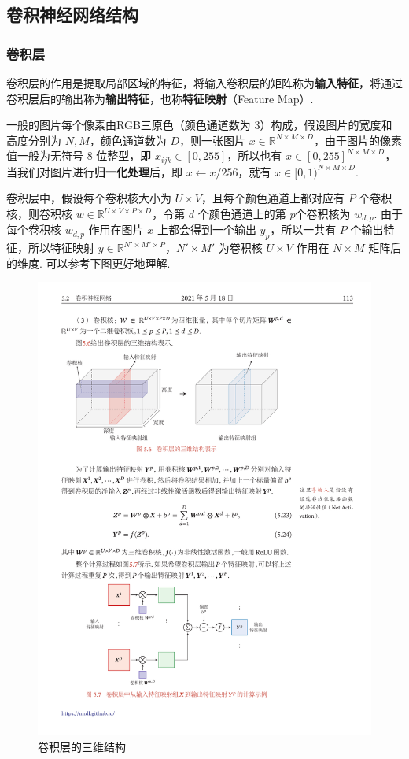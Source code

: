 \documentclass[12pt, a4paper, oneside]{ctexart}
\numberwithin{equation}{section}  %
\begin{document}
\subsection{卷积神经网络结构}
\subsubsection{卷积层}

卷积层的作用是提取局部区域的特征，将输入卷积层的矩阵称为\textbf{输入特征}，将通过卷积层后的输出称为\textbf{输出特征}，也称\textbf{特征映射}（Feature
Map）.

一般的图片每个像素由RGB三原色（颜色通道数为
\(3\)）构成，假设图片的宽度和高度分别为 \(N, M\)，颜色通道数为
\(D\)，则一张图片
\(x\in\mathbb{R}^{N\times M\times D}\)，由于图片的像素值一般为无符号
\(8\) 位整型，即 \(x_{ijk}\in[0,255]\)，所以也有
\(x\in[0,255]^{N\times M\times D}\)，当我们对图片进行\textbf{归一化处理}后，即
\(x\leftarrow x / 256\)，就有 \(x\in[0, 1)^{N\times M\times D}\).

卷积层中，假设每个卷积核大小为 \(U\times V\)，且每个颜色通道上都对应有
\(P\) 个卷积核，则卷积核
\(w\in\mathbb{R}^{U\times V\times P\times D}\)，令第 \(d\)
个颜色通道上的第 \(p\)个卷积核为 \(w_{d,p}\). 由于每个卷积核 \(w_{d,p}\)
作用在图片 \(x\) 上都会得到一个输出 \(y_p\)，所以一共有 \(P\)
个输出特征，所以特征映射
\(y\in\mathbb{R}^{N'\times M'\times P}\)，\(N'\times M'\) 为卷积核
\(U\times V\) 作用在 \(N\times M\) 矩阵后的维度. 可以参考下图更好地理解.
\begin{figure}[htbp]
    \centering
    \includegraphics[scale=1.4]{卷积层的三维结构.pdf}
    \caption{卷积层的三维结构}
    \label{fig-conv-struct}
\end{figure}
\end{document}
